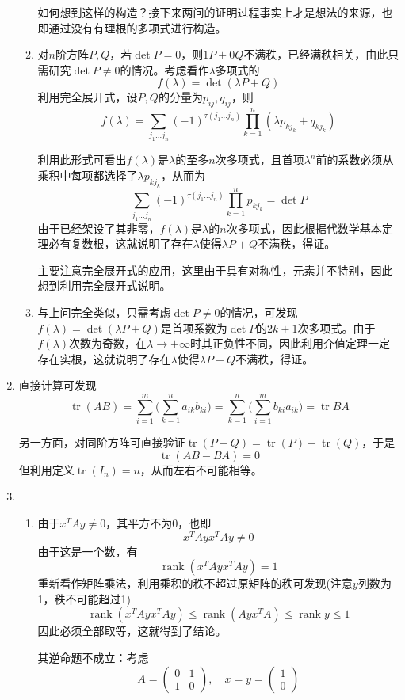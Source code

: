 \documentclass[a4paper,UTF8,fontset=windows]{ctexart}
\DeclareMathOperator{\rank}{rank}
\DeclareMathOperator{\tr}{tr}
\newcommand*{\note}{\noindent *}
\begin{document}
\begin{enumerate}
\begin{enumerate}[(1)]
        \note 如何想到这样的构造？接下来两问的证明过程事实上才是想法的来源，也即通过没有有理根的多项式进行构造。

        \item 
        对$n$阶方阵$P,Q$，若$\det P=0$，则$1P+0Q$不满秩，已经满秩相关，由此只需研究$\det P\ne0$的情况。考虑看作$\lambda$多项式的
        $$f(\lambda)=\det(\lambda P+Q)$$
        利用完全展开式，设$P,Q$的分量为$p_{ij},q_{ij}$，则
        $$f(\lambda)=\sum_{j_1\dots j_n}(-1)^{\tau(j_1\dots j_n)}\prod_{k=1}^n(\lambda p_{kj_k}+q_{kj_k})$$
        
        利用此形式可看出$f(\lambda)$是$\lambda$的至多$n$次多项式，且首项$\lambda^n$前的系数必须从乘积中每项都选择了$\lambda p_{kj_k}$，从而为
        $$\sum_{j_1\dots j_n}(-1)^{\tau(j_1\dots j_n)}\prod_{k=1}^np_{kj_k}=\det P$$
        由于已经架设了其非零，$f(\lambda)$是$\lambda$的$n$次多项式，因此根据代数学基本定理必有复数根，这就说明了存在$\lambda$使得$\lambda P+Q$不满秩，得证。

        \note 主要注意完全展开式的应用，这里由于具有对称性，元素并不特别，因此想到利用完全展开式说明。

        \item 
        与上问完全类似，只需考虑$\det P\ne0$的情况，可发现$f(\lambda)=\det(\lambda P+Q)$是首项系数为$\det P$的$2k+1$次多项式。由于$f(\lambda)$次数为奇数，在$\lambda\to\pm\infty$时其正负性不同，因此利用介值定理一定存在实根，这就说明了存在$\lambda$使得$\lambda P+Q$不满秩，得证。
    \end{enumerate}

    \item
    直接计算可发现
    $$\tr(AB)=\sum_{i=1}^m\bigg(\sum_{k=1}^na_{ik}b_{ki}\bigg)=\sum_{k=1}^n\bigg(\sum_{i=1}^mb_{ki}a_{ik}\bigg)=\tr{BA}$$

    另一方面，对同阶方阵可直接验证$\tr(P-Q)=\tr(P)-\tr(Q)$，于是
    $$\tr(AB-BA)=0$$
    但利用定义$\tr(I_n)=n$，从而左右不可能相等。

    \item
    \begin{enumerate}[(1)]
        \item 由于$x^TAy\ne 0$，其平方不为0，也即
        $$x^TAyx^TAy\ne0$$
        由于这是一个数，有
        $$\rank(x^TAyx^TAy)=1$$
        重新看作矩阵乘法，利用乘积的秩不超过原矩阵的秩可发现(注意$y$列数为1，秩不可能超过1)
        $$\rank(x^TAyx^TAy)\le\rank(Ayx^TA)\le\rank y\le1$$
        因此必须全部取等，这就得到了结论。

        其逆命题不成立：考虑
        $$A=\begin{pmatrix}0&1\\1&0\end{pmatrix},\quad x=y=\begin{pmatrix}1\\0\end{pmatrix}$$


\end{enumerate}
\end{enumerate}
\end{document}
